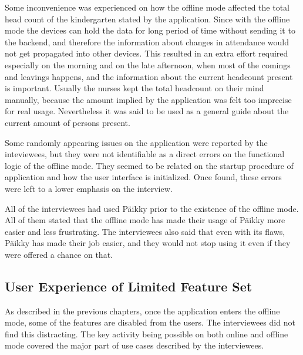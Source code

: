 Some inconvenience was experienced on how the offline mode affected the total head count of the kindergarten stated by the application. Since with the offline mode the devices can hold the data for long period of time without sending it to the backend, and therefore the information about changes in attendance would not get propagated into other devices. This resulted in an extra effort required especially on the morning and on the late afternoon, when most of the comings and leavings happens, and the information about the current headcount present is important. Usually the nurses kept the total headcount on their mind manually, because the amount implied by the application was felt too imprecise for real usage. Nevertheless it was said to be used as a general guide about the current amount of persons present.

Some randomly appearing issues on the application were reported by the inteviewees, but they were not identifiable as a direct errors on the functional logic of the offline mode. They seemed to be related on the startup procedure of application and how the user interface is initialized. Once found, these errors were left to a lower emphasis on the interview.

All of the interviewees had used Päikky prior to the existence of the offline mode. All of them stated that the offline mode has made their usage of Päikky more easier and less frustrating. The interviewees also said that even with its flaws, Päikky has made their job easier, and they would not stop using it even if they were offered a chance on that.






\subsection{User Experience of Limited Feature Set}

As described in the previous chapters, once the application enters the offline mode, some of the features are disabled from the users. The interviewees did not find this distracting. The key activity being possible on both online and offline mode covered the major part of use cases described by the interviewees.

